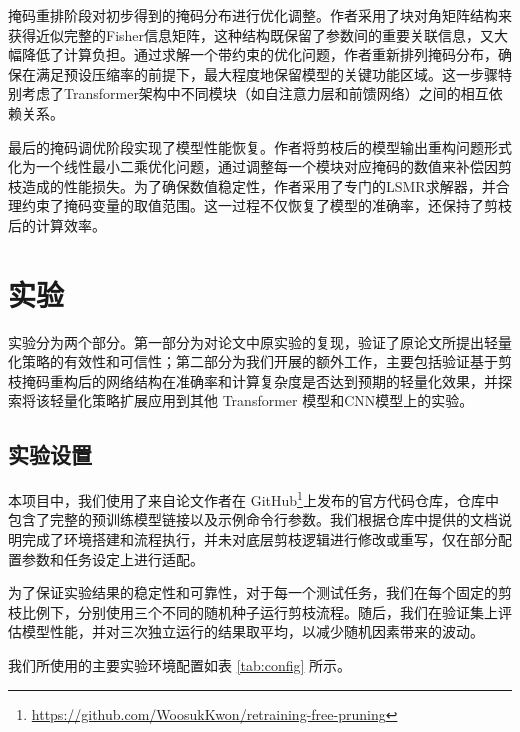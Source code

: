 \documentclass[UTF8,openany]{ctexbook}
\begin{document}
掩码重排阶段对初步得到的掩码分布进行优化调整。作者采用了块对角矩阵结构来获得近似完整的Fisher信息矩阵，这种结构既保留了参数间的重要关联信息，又大幅降低了计算负担。通过求解一个带约束的优化问题，作者重新排列掩码分布，确保在满足预设压缩率的前提下，最大程度地保留模型的关键功能区域。这一步骤特别考虑了Transformer架构中不同模块（如自注意力层和前馈网络）之间的相互依赖关系。

最后的掩码调优阶段实现了模型性能恢复。作者将剪枝后的模型输出重构问题形式化为一个线性最小二乘优化问题，通过调整每一个模块对应掩码的数值来补偿因剪枝造成的性能损失。为了确保数值稳定性，作者采用了专门的LSMR求解器，并合理约束了掩码变量的取值范围。这一过程不仅恢复了模型的准确率，还保持了剪枝后的计算效率。

\chapter{实验}

实验分为两个部分。第一部分为对论文中原实验的复现，验证了原论文所提出轻量化策略的有效性和可信性；第二部分为我们开展的额外工作，主要包括验证基于剪枝掩码重构后的网络结构在准确率和计算复杂度是否达到预期的轻量化效果，并探索将该轻量化策略扩展应用到其他 Transformer 模型和CNN模型上的实验。


\section{实验设置}

本项目中，我们使用了来自论文作者在 GitHub\footnote{\url{https://github.com/WoosukKwon/retraining-free-pruning}}上发布的官方代码仓库，仓库中包含了完整的预训练模型链接以及示例命令行参数。我们根据仓库中提供的文档说明完成了环境搭建和流程执行，并未对底层剪枝逻辑进行修改或重写，仅在部分配置参数和任务设定上进行适配。

为了保证实验结果的稳定性和可靠性，对于每一个测试任务，我们在每个固定的剪枝比例下，分别使用三个不同的随机种子运行剪枝流程。随后，我们在验证集上评估模型性能，并对三次独立运行的结果取平均，以减少随机因素带来的波动。

我们所使用的主要实验环境配置如表 \ref{tab:config} 所示。
\end{document}
